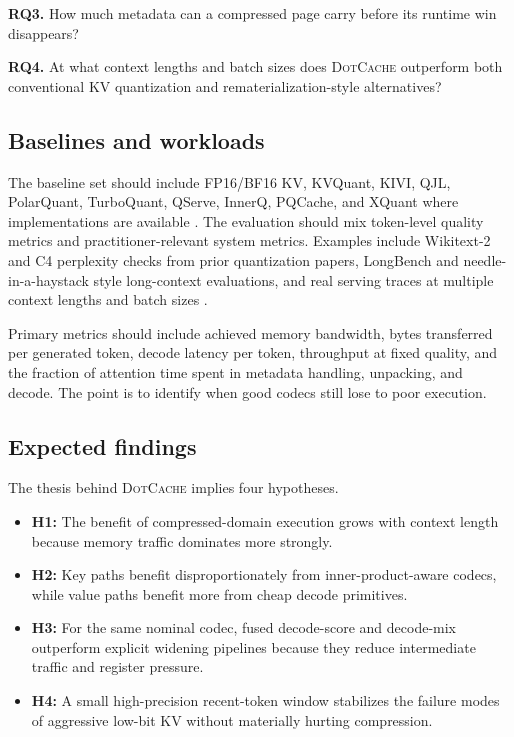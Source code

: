 \documentclass[11pt]{article}
\newcommand{\method}{\textsc{DotCache}}
\newcommand{\kv}{KV}
\begin{document}
\textbf{RQ3.} How much metadata can a compressed page carry before its runtime win disappears?

\textbf{RQ4.} At what context lengths and batch sizes does \method{} outperform both conventional \kv{} quantization and rematerialization-style alternatives?

\subsection{Baselines and workloads}

The baseline set should include FP16/BF16 \kv{}, KVQuant, KIVI, QJL, PolarQuant, TurboQuant, QServe, InnerQ, PQCache, and XQuant where implementations are available \cite{kvquant,kivi,qjl,polarquant,turboquant,qserve,innerq,pqcache,xquant}. The evaluation should mix token-level quality metrics and practitioner-relevant system metrics. Examples include Wikitext-2 and C4 perplexity checks from prior quantization papers, LongBench and needle-in-a-haystack style long-context evaluations, and real serving traces at multiple context lengths and batch sizes \cite{kvquant,turboquant}.

Primary metrics should include achieved memory bandwidth, bytes transferred per generated token, decode latency per token, throughput at fixed quality, and the fraction of attention time spent in metadata handling, unpacking, and decode. The point is to identify when good codecs still lose to poor execution.

\subsection{Expected findings}

The thesis behind \method{} implies four hypotheses.
\begin{itemize}
    \item \textbf{H1:} The benefit of compressed-domain execution grows with context length because memory traffic dominates more strongly.
    \item \textbf{H2:} Key paths benefit disproportionately from inner-product-aware codecs, while value paths benefit more from cheap decode primitives.
    \item \textbf{H3:} For the same nominal codec, fused decode-score and decode-mix outperform explicit widening pipelines because they reduce intermediate traffic and register pressure.
    \item \textbf{H4:} A small high-precision recent-token window stabilizes the failure modes of aggressive low-bit \kv{} without materially hurting compression.
\end{itemize}
\end{document}
